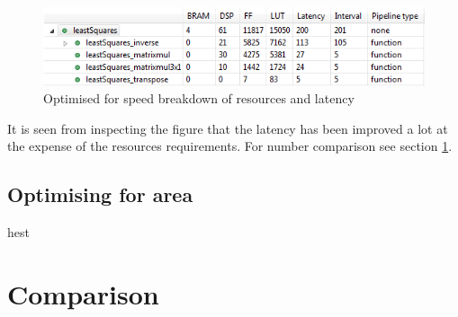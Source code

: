 \begin{figure}[H]
\centering
\includegraphics[scale=1]{billeder/SpeedAreaLatency}
\caption{Optimised for speed breakdown of resources and latency}
\label{fig:SpeedBreak}
\end{figure}
It is seen from inspecting the figure that the latency has been improved a lot at the expense of the resources requirements. For number comparison see section \ref{sec:Comp}.
\subsection{Optimising for area}
hest

\section{Comparison}
\label{sec:Comp}

